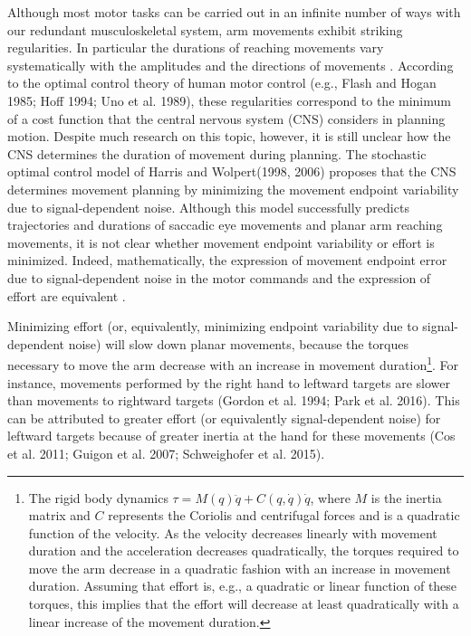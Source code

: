 Although most motor tasks can be carried out in an infinite number of ways with our redundant musculoskeletal system, arm movements exhibit striking regularities. In particular the durations of reaching movements vary systematically with the amplitudes and the directions of movements \cite{Gordon1994}. According to the optimal control theory of human motor control (e.g., \cite{Flash1985, Hoff1994, Uno1989} Flash and Hogan 1985; Hoff 1994; Uno et al. 1989), these regularities correspond to the minimum of a cost function that the central nervous system (CNS) considers in planning motion. Despite much research on this topic, however, it is still unclear how the CNS determines the duration of movement during planning. The stochastic optimal control model of \cite{Harris1998, Harris2006} Harris and Wolpert(1998, 2006) proposes that the CNS determines movement planning by minimizing the movement endpoint variability due to signal-dependent noise. Although this model successfully predicts trajectories and durations of saccadic eye movements and planar arm reaching movements, it is not clear whether movement endpoint variability or effort is minimized. Indeed, mathematically, the expression of movement endpoint error due to signal-dependent noise in the motor commands and the expression of effort are equivalent \cite{OSullivan2009}.

Minimizing effort (or, equivalently, minimizing endpoint variability due to signal-dependent noise) will slow down planar movements, because the torques necessary to move the arm decrease with an increase in movement duration\footnote{The rigid body dynamics $\tau = M(q)\ddot{q} + C(q,\dot{q})\dot{q}$, where $M$ is the inertia matrix and $C$ represents the Coriolis and centrifugal forces and is a quadratic function of the velocity. As the velocity decreases linearly with movement duration and the acceleration decreases quadratically, the torques required to move the arm decrease in a quadratic fashion with an increase in movement duration. Assuming that effort is, e.g., a quadratic or linear function of these torques, this implies that the effort will decrease at least quadratically with a linear increase of the movement duration.}. For instance, movements performed by the right hand to leftward targets are slower than movements to rightward targets (Gordon et al. 1994; Park et al. 2016). This can be attributed to greater effort (or equivalently signal-dependent noise) for leftward targets because of greater inertia at the hand for these movements (Cos et al. 2011; Guigon et al. 2007; Schweighofer et al. 2015). 

